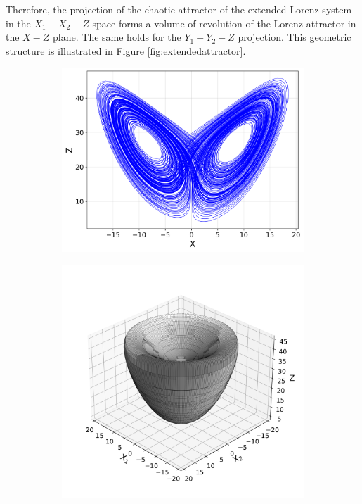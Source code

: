 \documentclass[paper=a4, fontsize=11pt]{scrartcl}
\numberwithin{equation}{section}		%
\numberwithin{figure}{section}			%
\numberwithin{table}{section}				%
\begin{document}
Therefore, the projection of the chaotic attractor of the extended Lorenz system in the $X_1-X_2-Z$ space forms a volume of revolution of the Lorenz attractor in the $X-Z$ plane. The same holds for the $Y_1-Y_2-Z$ projection. This geometric structure is illustrated in Figure \ref{fig:extendedattractor}.\\
	
\begin{figure}[hbt!]
	\centering
	\begin{subfigure}[b]{0.495\textwidth}
		\centering
		\includegraphics[width=\textwidth]{media/lorenz_xz_projection.png}
		\caption{}
		\label{fig:sub1}
	\end{subfigure}
	\hfill
	\begin{subfigure}[b]{0.495\textwidth}
		\centering
		\includegraphics[width=\textwidth]{media/lorenz_surface_of_revolution.png}

\end{subfigure}
\end{figure}
\end{document}
